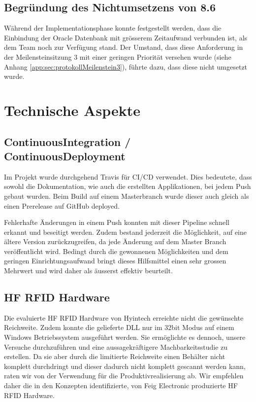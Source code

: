 \subsection{Begründung des Nichtumsetzens von 8.6}
Während der Implementationsphase konnte festgestellt werden, dass die Einbindung der Oracle Datenbank mit grösserem Zeitaufwand verbunden ist, als dem Team noch zur Verfügung stand. Der Umstand, dass diese Anforderung in der Meilensteinsitzung 3 mit einer geringen Priorität versehen wurde (siehe Anhang \ref{app:sec:protokollMeilenstein3}), führte dazu, dass diese nicht umgesetzt wurde.

\section{Technische Aspekte}
\subsection{ContinuousIntegration / ContinuousDeployment}
Im Projekt wurde durchgehend Travis für CI/CD verwendet. Dies bedeutete, dass sowohl die Dokumentation, wie auch die erstellten Applikationen, bei jedem Push gebaut wurden. Beim Build auf einem Masterbranch wurde dieser auch gleich als einen Prerelease auf GitHub deployed.

Fehlerhafte Änderungen in einem Push konnten mit dieser Pipeline schnell erkannt und beseitigt werden. Zudem bestand jederzeit die Möglichkeit, auf eine ältere Version zurückzugreifen, da jede Änderung auf dem Master Branch veröffentlicht wird. Bedingt durch die gewonnenen Möglichkeiten und  dem geringen Einrichtungsaufwand bringt dieses Hilfsmittel einen sehr grossen Mehrwert und wird daher als äusserst effektiv beurteilt.

\subsection{HF RFID Hardware}
Die evaluierte \gls{HF} \gls{RFID} Hardware von Hyintech erreichte nicht die gewünschte Reichweite. Zudem konnte die gelieferte \gls{DLL} nur im 32bit Modus auf einem Windows Betriebssystem ausgeführt werden. Sie ermöglichte es dennoch, unsere Versuche durchzuführen und eine aussagekräftigere Machbarkeitsstudie zu erstellen. Da sie aber durch die limitierte Reichweite einen Behälter nicht komplett durchdringt und dieser dadurch nicht komplett gescannt werden kann, raten wir von der Verwendung für die Produktivrealisierung ab. Wir empfehlen daher die in den Konzepten identifizierte, von Feig Electronic produzierte \gls{HF} \gls{RFID} Hardware.

